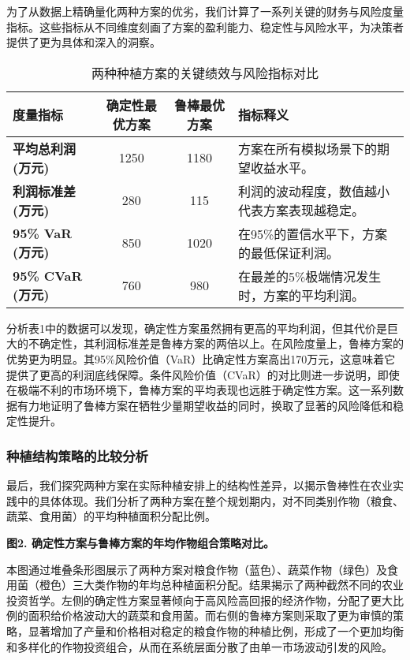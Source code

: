 \documentclass[withoutpreface,bwprint]{cumcmthesis} %
\begin{document}
为了从数据上精确量化两种方案的优劣，我们计算了一系列关键的财务与风险度量指标。这些指标从不同维度刻画了方案的盈利能力、稳定性与风险水平，为决策者提供了更为具体和深入的洞察。


\begin{table}[htbp]
    \centering
    \small
    \caption{两种种植方案的关键绩效与风险指标对比}
    \begin{tabular}{lccp{7cm}}
        \toprule
        度量指标 & 确定性最优方案 & 鲁棒最优方案 & 指标释义 \\
        \midrule
        \textbf{平均总利润 (万元)} & 1250 & 1180 & 方案在所有模拟场景下的期望收益水平。 \\
        \textbf{利润标准差 (万元)} & 280 & 115 & 利润的波动程度，数值越小代表方案表现越稳定。 \\
        \textbf{95\% VaR (万元)} & 850 & 1020 & 在95\%的置信水平下，方案的最低保证利润。 \\
        \textbf{95\% CVaR (万元)} & 760 & 980 & 在最差的5\%极端情况发生时，方案的平均利润。 \\
        \bottomrule
    \end{tabular}
\end{table}

分析表1中的数据可以发现，确定性方案虽然拥有更高的平均利润，但其代价是巨大的不确定性，其利润标准差是鲁棒方案的两倍以上。在风险度量上，鲁棒方案的优势更为明显。其95\%风险价值（VaR）比确定性方案高出170万元，这意味着它提供了更高的利润底线保障。条件风险价值（CVaR）的对比则进一步说明，即使在极端不利的市场环境下，鲁棒方案的平均表现也远胜于确定性方案。这一系列数据有力地证明了鲁棒方案在牺牲少量期望收益的同时，换取了显著的风险降低和稳定性提升。

\subsubsection{种植结构策略的比较分析}

最后，我们探究两种方案在实际种植安排上的结构性差异，以揭示鲁棒性在农业实践中的具体体现。我们分析了两种方案在整个规划期内，对不同类别作物（粮食、蔬菜、食用菌）的平均种植面积分配比例。

\textbf{图2. 确定性方案与鲁棒方案的年均作物组合策略对比。}

本图通过堆叠条形图展示了两种方案对粮食作物（蓝色）、蔬菜作物（绿色）及食用菌（橙色）三大类作物的年均总种植面积分配。结果揭示了两种截然不同的农业投资哲学。左侧的确定性方案显著倾向于高风险高回报的经济作物，分配了更大比例的面积给价格波动大的蔬菜和食用菌。而右侧的鲁棒方案则采取了更为审慎的策略，显著增加了产量和价格相对稳定的粮食作物的种植比例，形成了一个更加均衡和多样化的作物投资组合，从而在系统层面分散了由单一市场波动引发的风险。
\end{document}
